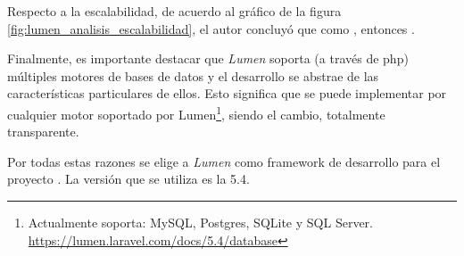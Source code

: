 
Respecto a la escalabilidad, de acuerdo al gráfico de la figura \ref{fig:lumen_analisis_escalabilidad}, el autor concluyó que como , entonces  \cite{biler2015performance}.


Finalmente, es importante destacar que \textit{Lumen} soporta (a través de \gls{php}) múltiples motores de bases de datos y el desarrollo se abstrae de las características particulares de ellos. Esto significa que se puede implementar por cualquier motor soportado por Lumen\footnote{Actualmente soporta: MySQL, Postgres, SQLite y SQL Server. \url{https://lumen.laravel.com/docs/5.4/database}}, siendo el cambio, totalmente transparente.

Por todas estas razones se elige a \textit{Lumen} como \gls{framework} de desarrollo para el proyecto \nombreApp. La versión que se utiliza es la 5.4.
